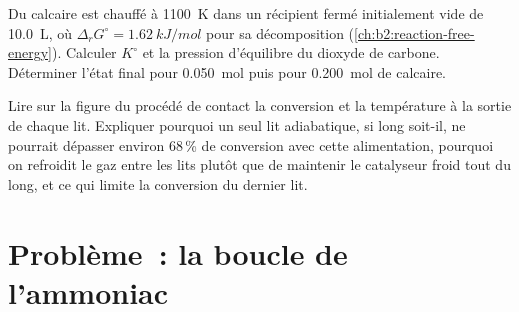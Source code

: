 \begin{exercise}[$\star\star\star$]\label{exo:b2:equilibrium-shifts:11}
Du calcaire est chauffé à \qty{1100}{K} dans un récipient fermé initialement vide de
\qty{10.0}{L}, où $\Delta_r G^\circ = \qty{1.62}{kJ/mol}$ pour sa
décomposition (\cref{ch:b2:reaction-free-energy}). Calculer $K^\circ$ et la
pression d'équilibre du dioxyde de carbone. Déterminer l'état final pour
\qty{0.050}{mol} puis pour \qty{0.200}{mol} de calcaire.
\end{exercise}

\begin{exercise}[$\star\star\star$]\label{exo:b2:equilibrium-shifts:12}
Lire sur la figure du procédé de contact la conversion et la température à la
sortie de chaque lit. Expliquer pourquoi un seul lit adiabatique, si long soit-il, ne pourrait
dépasser environ 68\,\% de conversion avec cette alimentation, pourquoi on refroidit le gaz
entre les lits plutôt que de maintenir le catalyseur froid tout du long, et ce qui limite
la conversion du dernier lit.
\end{exercise}

\section{Problème~: la boucle de l'ammoniac}

